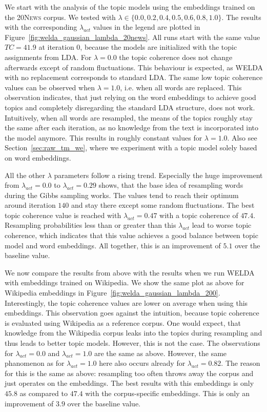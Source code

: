 \documentclass[
        a4paper,
        titlepage,
        twoside,
        parskip,
        numbers=noenddot
        ]{scrbook}
\theoremstyle{break}
\begin{document}
We start with the analysis of the topic models using the embeddings trained on the \textsc{20News} corpus.
We tested with $\lambda \in \{ 0.0, 0.2, 0.4, 0.5, 0.6, 0.8, 1.0 \}$.
The results with the corresponding $\lambda_{act}$ values in the legend are plotted in Figure~\ref{fig:welda_gaussian_lambda_20news}.
All runs start with the same value $TC = 41.9$ at iteration 0, because the models are initialized with the topic assignments from LDA.
For $\lambda = 0.0$ the topic coherence does not change afterwards except of random fluctuations.
This behaviour is expected, as WELDA with no replacement corresponds to standard LDA.
The same low topic coherence values can be observed when $\lambda = 1.0$, i.e. when all words are replaced.
This observation indicates, that just relying on the word embeddings to achieve good topics and completely disregarding the standard LDA structure, does not work.
Intuitively, when all words are resampled, the means of the topics roughly stay the same after each iteration, as no knowledge from the text is incorporated into the model anymore.
This results in roughly constant values for $\lambda = 1.0$.
Also see Section~\ref{sec:raw_tm_we}, where we experiment with a topic model solely based on word embeddings.

All the other $\lambda$ parameters follow a rising trend.
Especially the huge improvement from $\lambda_{act} = 0.0$ to $\lambda_{act} = 0.29$ shows, that the base idea of resampling words during the Gibbs sampling works.
The values tend to reach their optimum around iteration $140$ and stay there except some random fluctuations.
The best topic coherence value is reached with $\lambda_{act} = 0.47$ with a topic coherence of $47.4$.
Resampling probabilities less than or greater than this $\lambda_{act}$ lead to worse topic coherence, which indicates that this value achieves a good balance between topic model and word embeddings.
All together, this is an improvement of $5.1$ over the baseline value.

We now compare the results from above with the results when we run WELDA with embeddings trained on Wikipedia.
We show the same plot as above for Wikipedia embeddings in Figure~\ref{fig:welda_gaussian_lambda_200}.
Interestingly, the topic coherence values are lower on average when using this embeddings.
This observation goes against the intuition, because topic coherence is evaluated using Wikipedia as a reference corpus.
One would expect, that knowledge from the Wikipedia corpus leaks into the topics during resampling and thus leads to better topic models.
However, this is not the case.
The observations for $\lambda_{act} = 0.0$ and $\lambda_{act} = 1.0$ are the same as above.
However, the same phanomenon as for $\lambda_{act} = 1.0$ here also occurs already for $\lambda_{act} = 0.82$.
The reason for this is the same as above: resampling too often throws away the corpus and just operates on the embeddings.
The best results with this embeddings is only $45.8$ as compared to $47.4$ with the corpus-specific embeddings.
This is only an improvement of $3.9$ over the baseline value.
\end{document}
